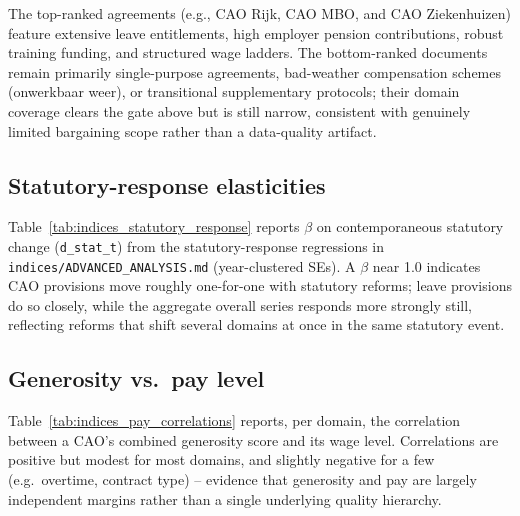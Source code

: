 The top-ranked agreements (e.g., CAO Rijk, CAO MBO, and CAO Ziekenhuizen) feature extensive leave entitlements, high employer pension contributions, robust training funding, and structured wage ladders. The bottom-ranked documents remain primarily single-purpose agreements, bad-weather compensation schemes (onwerkbaar weer), or transitional supplementary protocols; their domain coverage clears the gate above but is still narrow, consistent with genuinely limited bargaining scope rather than a data-quality artifact.

\subsection*{Statutory-response elasticities}

Table~\ref{tab:indices_statutory_response} reports $\beta$ on contemporaneous statutory change (\texttt{d\_stat\_t}) from the statutory-response regressions in \texttt{indices/ADVANCED\_ANALYSIS.md} (year-clustered SEs). A $\beta$ near 1.0 indicates CAO provisions move roughly one-for-one with statutory reforms; leave provisions do so closely, while the aggregate overall series responds more strongly still, reflecting reforms that shift several domains at once in the same statutory event.

\begin{table}[H]
    \centering
    \caption{Statutory-response elasticities by domain}
    \label{tab:indices_statutory_response}
    
\end{table}

\subsection*{Generosity vs.\ pay level}

Table~\ref{tab:indices_pay_correlations} reports, per domain, the correlation between a CAO's combined generosity score and its wage level. Correlations are positive but modest for most domains, and slightly negative for a few (e.g.\ overtime, contract type) -- evidence that generosity and pay are largely independent margins rather than a single underlying quality hierarchy.

\begin{table}[H]
    \centering
    \caption{Correlation between domain generosity and wage level}
    \label{tab:indices_pay_correlations}
    
\end{table}

